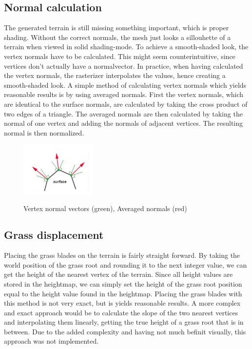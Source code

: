 \documentclass[conference]{acmsiggraph}
\begin{document}
\subsection{Normal calculation}
The generated terrain is still missing something important, which is proper shading. Without the correct normals, the mesh just looks a sillouhette of a terrain when viewed in solid shading-mode. To achieve a smooth-shaded look, the vertex normals have to be calculated. This might seem counterintuitive, since vertices don’t actually have a normalvector. In practice, when having calculated the vertex normals, the rasterizer interpolates the values, hence creating a smooth-shaded look. A simple method of calculating vertex normals which yields reasonable results is by using averaged normals. First the vertex normals, which are identical to the surface normals, are calculated by  taking the cross product  of two edges of a triangle. The averaged normals are  then calculated by taking the normal of one vertex and adding the normals of adjacent vertices. The resulting normal is then normalized.\cite{Rasterizer}

 \begin{figure}[ht]
   \centering
   \includegraphics[width=1.5in]{images/terrain_normals}
   \caption{Vertex normal vectors (green), Averaged normals (red)} \cite{TerrainNormals}
 \end{figure}

\subsection{Grass displacement}
Placing the grass blades on the terrain is fairly straight forward. By taking the world position of the grass root and rounding it to the next integer value, we can get the height of the nearest vertex of the terrain. Since all height values are stored in the heightmap, we can simply set the height of the grass root position equal to the height value found in the heightmap. Placing the grass blades with this method is not very exact, but is yields reasonable results. A more complex and exact approach would be to calculate the slope of the two nearest vertices and interpolating them linearly, getting the true height of a grass root that is in between. Due to the added complexity and having not much befinit visually, this approach was not implemented.
\end{document}
